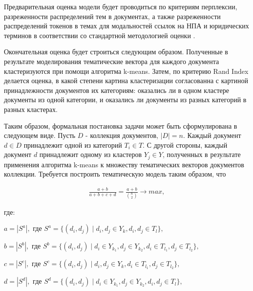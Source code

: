 \documentclass[12pt]{article}
\begin{document}

Предварительная оценка модели будет проводиться по критериям перплексии, разреженности распределений тем в документах, а также разреженности распределений токенов в темах для модальностей ссылок на НПА и юридических терминов в соответствии со стандартной методологией оценки \cite{vorontsov2015additive}. 

Окончательная оценка будет строиться следующим образом. Полученные в результате моделирования тематические вектора для каждого документа кластеризуются при помощи алгоритма k-means. Затем, по критерию Rand Index делается оценка, в какой степени картина кластеризации согласованна с картиной принадлежности документов их категориям:  оказались ли в одном кластере документы из одной категории, и оказались ли документы из разных категорий в разных кластерах.

Таким образом, формальная постановка задачи может быть сформулирована в следующем виде.
Пусть $D$ - коллекция документов, $|D|=n$. Каждый документ $d\in D$ принадлежит одной из категорий $T_{i}\in T$. С другой стороны, каждый документ $d$ принадлежит одному из кластеров $Y_{j}\in Y$, полученных в результате применения алгоритма k-means к множеству тематических векторов документов коллекции. Требуется построить тематическую модель таким образом, что


\begin{align*}
\frac{a+b}{a+b+c+d} = \frac{a+b}{{n \choose 2 }}\to max,
\end{align*}

где:

$a = |S^{a}|,$ где $S^{a} = \{ (d_{i}, d_{j}) \mid d_{i}, d_{j} \in Y_{k}, d_{i}, d_{j} \in T_{l}\},$

$b = |S^{b}|,$ где $S^{b} = \{ (d_{i}, d_{j}) \mid d_{i} \in Y_{k_{1}}, d_{j} \in Y_{k_{2}}, d_{i} \in T_{l_{1}}, d_{j} \in T_{l_{2}}\},$

$c = |S^{c}|,$ где $S^{c} = \{ (d_{i}, d_{j}) \mid d_{i}, d_{j} \in Y_{k}, d_{i} \in T_{l_{1}}, d_{j} \in T_{l_{2}}\},$

$d = |S^{d}|,$ где $S^{d} = \{ (d_{i}, d_{j}) \mid d_{i} \in Y_{k_{1}}, d_{j} \in Y_{k_{2}}, d_{i}, d_{j} \in T_{l}\},$
\end{document}
